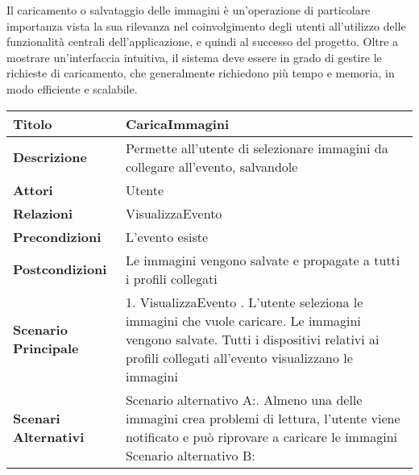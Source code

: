 Il caricamento o salvataggio delle immagini è un'operazione di particolare importanza vista la sua rilevanza
nel coinvolgimento degli utenti all'utilizzo delle funzionalità centrali dell'applicazione, e quindi al successo del progetto.
Oltre a mostrare un'interfaccia intuitiva, il sistema deve essere in grado di gestire le richieste di caricamento, 
che generalmente richiedono più tempo e memoria, in modo efficiente e scalabile.\\
\clearpage

\begin{table}[htb]
    \begin{tabular} {|P{4.5cm}|P{11cm}|}
        \hline
        \textbf{Titolo}                   & CaricaImmagini                                                                  \\
        \hline
        \textbf{Descrizione}              & Permette all'utente di selezionare immagini da collegare all'evento, salvandole \\
        \hline
        \textbf{Attori}                   & Utente                                                                          \\
        \hline
        \textbf{Relazioni}                & VisualizzaEvento                                                                \\
        \hline
        \textbf{Precondizioni}            & L'evento esiste                                                                 \\
        \hline
        \textbf{Postcondizioni}           & Le immagini vengono salvate e propagate a tutti i profili collegati             \\
        \hline
        \textbf{Scenario Principale}      & 1. VisualizzaEvento . L'utente seleziona le immagini che vuole caricare. Le immagini vengono salvate. Tutti i dispositivi relativi ai profili collegati all'evento visualizzano le immagini                            \\
        \hline
        \textbf{Scenari Alternativi}      &
        Scenario alternativo A:. Almeno una delle immagini crea problemi di lettura,
        l'utente viene notificato e può riprovare a caricare le immagini\newline
        Scenario alternativo B:\newline

\end{tabular}
\end{table}
